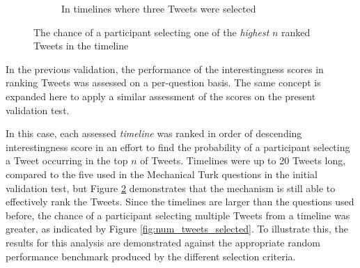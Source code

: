 \begin{figure}[h]
\begin{subfigure}{.5\textwidth}
    \centering
    \caption{In timelines where three Tweets were selected}
    \label{fig:rank-three}
\end{subfigure}
\caption{The chance of a participant selecting one of the \textit{highest} $n$ ranked Tweets in the timeline}
\label{fig:ranked_timelines_1}
\end{figure}

In the previous validation, the performance of the interestingness scores in ranking Tweets was assessed on a per-question basis. The same concept is expanded here to apply a similar assessment of the scores on the present validation test.

In this case, each assessed \textit{timeline} was ranked in order of descending interestingness score in an effort to find the probability of a participant selecting a Tweet occurring in the top $n$ of Tweets. Timelines were up to 20 Tweets long, compared to the five used in the Mechanical Turk questions in the initial validation test, but Figure \ref{fig:ranked_timelines_1} demonstrates that the mechanism is still able to effectively rank the Tweets. Since the timelines are larger than the questions used before, the chance of a participant selecting multiple Tweets from a timeline was greater, as indicated by Figure \ref{fig:num_tweets_selected}. To illustrate this, the results for this analysis are demonstrated against the appropriate random performance benchmark produced by the different selection criteria.

